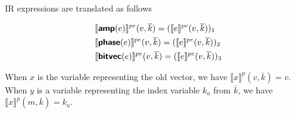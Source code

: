 \documentclass[runningheads]{llncs}
\newcommand {\sem} [1] {\llbracket #1 \rrbracket}
\newcommand {\Psem} [1] {\sem{#1}^p}
\newcommand {\PsemE} [1] {\sem{#1}^{pe}}
\newcommand {\ir} [1] {\textsf{\textbf{#1}}}
\newcommand {\irAmp} {\ir{amp}}
\newcommand {\irPhase} {\ir{phase}}
\newcommand {\irBV} {\ir{bitvec}}
\begin{document}
\noindent
IR expressions are translated as follows

\begin{align*}
  &\PsemE{\irAmp(e)}(v, \overline{k}) = (\PsemE{e}(v, \overline{k}))_1\\
  &\PsemE{\irPhase(e)}(v, \overline{k}) = (\PsemE{e}(v, \overline{k}))_2\\
  &\PsemE{\irBV(e)}(v, \overline{k}) = (\PsemE{e}(v, \overline{k}))_3
\end{align*}

When $x$ is the variable representing the old vector, we have $\Psem{x}(v, \overline{k}) = v$. When $y$ is a variable representing the index variable $k_a$ from $\overline{k}$, we have $\Psem{x}(m, \overline{k}) = k_a$.
\end{document}

